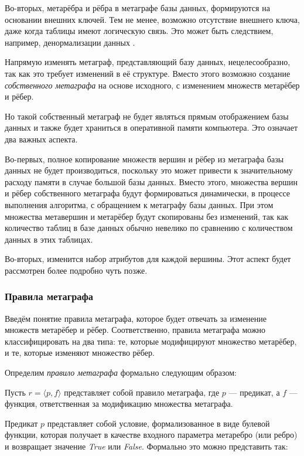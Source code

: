 Во-вторых, метарёбра и рёбра в метаграфе базы данных, формируются на основании внешних ключей. Тем не менее, возможно отсутствие внешнего ключа, даже когда таблицы имеют логическую связь. Это может быть следствием, например, денормализации данных \cite{denormalization}.

Напрямую изменять метаграф, представляющий базу данных, нецелесообразно, так как это требует изменений в её структуре. Вместо этого возможно создание \textit{собственного метаграфа} на основе исходного, с изменением множеств метарёбер и рёбер.

Но такой собственный метаграф не будет являться прямым отображением базы данных и также будет храниться в оперативной памяти компьютера. Это означает два важных аспекта.

Во-первых, полное копирование множеств вершин и рёбер из метаграфа базы данных не будет производиться, поскольку это может привести к значительному расходу памяти в случае большой базы данных. Вместо этого, множества вершин и рёбер собственного метаграфа будут формироваться динамически, в процессе выполнения алгоритма, с обращением к метаграфу базы данных. При этом множества метавершин и метарёбер будут скопированы без изменений, так как количество таблиц в базе данных обычно невелико по сравнению с количеством данных в этих таблицах.

Во-вторых, изменится набор атрибутов для каждой вершины. Этот аспект будет рассмотрен более подробно чуть позже.

\subsubsection{Правила метаграфа}
Введём понятие правила метаграфа, которое будет отвечать за изменение множеств метарёбер и рёбер. Соответственно, правила метаграфа можно классифицировать на два типа: те, которые модифицируют множество метарёбер, и те, которые изменяют множество рёбер.

Определим \textit{правило метаграфа} формально следующим образом:

Пусть $r = \langle p, f \rangle$ представляет собой правило метаграфа, где $p$ — предикат, а $f$ — функция, ответственная за модификацию множества метаграфа.

Предикат $p$ представляет собой условие, формализованное в виде булевой функции, которая получает в качестве входного параметра метаребро (или ребро) и возвращает значение \textit{True} или \textit{False}. Формально это можно представить так:


